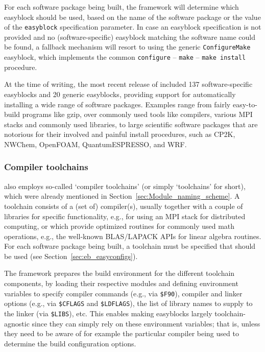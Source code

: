 For each software package being built, the \easybuild{} framework will determine
which easyblock should be used, based on the name of the software package or the
value of the \texttt{\small easyblock} specification parameter. In case an easyblock
specification is not provided and no (software-specific) easyblock matching the
software name could be found, a fallback mechanism will resort to using the generic
\texttt{\small ConfigureMake} easyblock, which implements the common
\texttt{\small configure} -- \texttt{\small make} -- \texttt{\small make install}
procedure.

At the time of writing, the most recent release of \easybuild{} included 137
software-specific easyblocks and 20 generic easyblocks, providing support for
automatically installing a wide range of software packages. Examples range
from fairly easy-to-build programs like gzip, over commonly used tools like
compilers, various MPI stacks and commonly used libraries, to large scientific
software packages that are notorious for their involved and painful install
procedures, such as CP2K, NWChem, OpenFOAM, QuantumESPRESSO, and WRF.

\subsubsection{Compiler toolchains}
\label{sec:eb_toolchains}

\easybuild{} also employs so-called `compiler toolchains' (or simply `toolchains'
for short), which were already mentioned in Section~\ref{sec:Module_naming_scheme}.
A toolchain consists of a (set of) compiler(s), usually together with a couple of
libraries for specific functionality, e.g., for using an MPI stack for distributed
computing, or which provide optimized routines for commonly used math operations,
e.g., the well-known BLAS/LAPACK APIs for linear algebra routines. For each software
package being built, a toolchain must be specified that should be used
(see Section~\ref{sec:eb_easyconfigs}).

The \easybuild{} framework prepares the build environment for the different
toolchain components, by loading their respective modules and defining environment
variables to specify compiler commands (e.g., via \texttt{\small \$F90}), compiler
and linker options (e.g., via \texttt{\small \$CFLAGS} and
\texttt{\small \$LDFLAGS}), the list of library names to supply to the linker (via
\texttt{\small \$LIBS}), etc. This enables
making easyblocks largely toolchain-agnostic since they can simply rely on these
environment variables; that is, unless they need to be aware of for example the
particular compiler being used to determine the build configuration options.

